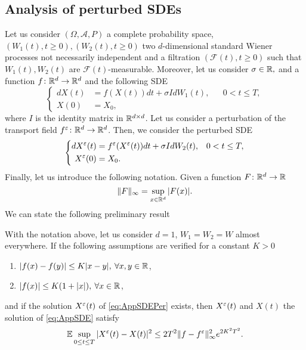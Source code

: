 \subsection{Analysis of perturbed SDEs}
Let us consider $(\Omega, \mathcal{A}, P)$ a complete probability space, $(W_1(t), t\geq 0), (W_2(t), t\geq 0)$ two $d$-dimensional standard Wiener processes not necessarily independent and a filtration $(\mathcal{F}(t), t \geq 0)$ such that $W_1(t), W_2(t)$ are $\mathcal{F}(t)$-measurable. Moreover, let us consider $\sigma \in \mathbb{R},$ and a function $f\colon \mathbb{R}^d \rightarrow \mathbb{R}^d$ and the following SDE
\begin{equation}\label{eq:AppSDE}
\left \{
\begin{aligned}
	dX(t) &= f(X(t))dt + \sigma IdW_1(t), && 0 < t \leq T, \\
	X(0) &= X_0,
\end{aligned} \right .
\end{equation}
where $I$ is the identity matrix in $\mathbb{R}^{d\times d}$. Let us consider a perturbation of the transport field $f^\varepsilon\colon \mathbb{R}^d \rightarrow \mathbb{R}^d$. Then, we consider the perturbed SDE 
\begin{equation}\label{eq:AppSDEPer}
\left \{
\begin{aligned}
	dX^\varepsilon(t) &= f^\varepsilon(X^\varepsilon(t))dt + \sigma I dW_2(t), && 0 < t \leq T, \\
	X^\varepsilon(0) &= X_0.
\end{aligned} \right .
\end{equation}
Finally, let us introduce the following notation. Given a function $F\colon \mathbb{R}^d \to \mathbb{R}$
\begin{equation*}
	\|F\|_{\infty} = \sup_{x\in \mathbb{R}^d} |F(x)|.
\end{equation*}
We can state the following preliminary result
\begin{lemma}\label{lem:Lemma1} With the notation above, let us consider $d = 1$, $W_1 = W_2 = W$ almost everywhere. If the following assumptions are verified for a constant $K > 0$
\begin{enumerate}
	\item $|f(x) - f(y)| \leq K|x - y|, \: \forall x,y \in \mathbb{R}$,
	\item $|f(x)| \leq K(1 + |x|), \: \forall x \in \mathbb{R}$,
\end{enumerate}
and if the solution $X^\varepsilon(t)$ of \eqref{eq:AppSDEPer} exists, then $X^\varepsilon(t)$ and $X(t)$ the solution of \eqref{eq:AppSDE} satisfy
\begin{equation*}
	\mathbb{E} \sup_{0 \leq t \leq T} |X^\varepsilon(t) - X(t)|^2 \leq  2T^2 \|f - f^\varepsilon\|_{\infty}^2 e^{2K^2T^2}.
\end{equation*}
\end{lemma}

